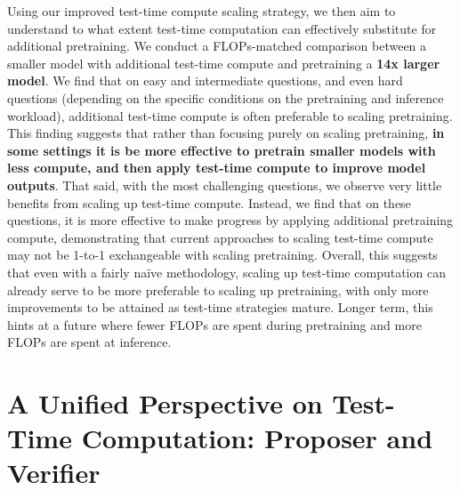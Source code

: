 \documentclass[11pt, letterpaper, logo]{googledeepmind}
\begin{document}
Using our improved test-time compute scaling strategy, we then aim to understand to what extent test-time computation can effectively substitute for additional pretraining. We conduct a FLOPs-matched comparison between a smaller model with additional test-time compute and pretraining a \textbf{14x larger model}. We find that on easy and intermediate questions, and even hard questions (depending on the specific conditions on the pretraining and inference workload), additional test-time compute is often preferable to scaling pretraining. This finding suggests that rather than focusing purely on scaling pretraining, \textbf{in some settings it is be more effective to pretrain smaller models with less compute, and then apply test-time compute to improve model outputs}. That said, with the most challenging questions, we observe very little benefits from scaling up test-time compute. Instead, we find that on these questions, it is more effective to make progress by applying additional pretraining compute, demonstrating that current approaches to scaling test-time compute may not be 1-to-1 exchangeable with scaling pretraining. Overall, this suggests that even with a fairly na\"ive methodology, scaling up test-time computation can already serve to be more preferable to scaling up pretraining, with only more improvements to be attained as test-time strategies mature. Longer term, this hints at a future where fewer FLOPs are spent during pretraining and more FLOPs are spent at inference.

\vspace{-0.2cm}
\section{A Unified Perspective on Test-Time Computation: Proposer and Verifier}
\label{sec:unifying_perspective}
\vspace{-0.2cm}
\end{document}
